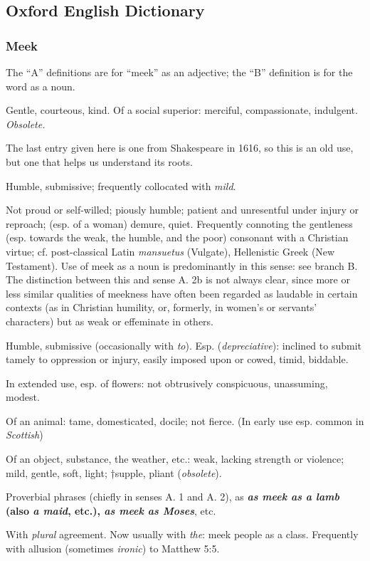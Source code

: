 \subsection{Oxford English Dictionary} %
	\label{MEEKNESS-OED}
	
	\subsubsection{Meek}
	
		The ``A'' definitions are for ``meek'' as an adjective; the ``B'' definition is for the word as a noun.

		\begin{compactitem}
			\item[A.1] Gentle, courteous, kind. Of a social superior: merciful, compassionate, indulgent. \textit{Obsolete.}
				\begin{compactitem}
					\item The last entry given here is one from Shakespeare in 1616, so this is an old use, but one that helps us understand its roots.
				\end{compactitem}
			\item[A.2] Humble, submissive; frequently collocated with \textit{mild}.
			\item[A.2.a] Not proud or self-willed; piously humble; patient and unresentful under injury or reproach; (esp. of a woman) demure, quiet. Frequently connoting the gentleness (esp. towards the weak, the humble, and the poor) consonant with a Christian virtue; cf. post-classical Latin \textit{mansuetus} (Vulgate), Hellenistic Greek  (New Testament). Use of meek as a noun is predominantly in this sense: see branch B. The distinction between this and sense A. 2b is not always clear, since more or less similar qualities of meekness have often been regarded as laudable in certain contexts (as in Christian humility, or, formerly, in women's or servants' characters) but as weak or effeminate in others.
			\item[A.2.b] Humble, submissive (occasionally with \textit{to}). Esp. (\textit{depreciative}): inclined to submit tamely to oppression or injury, easily imposed upon or cowed, timid, biddable.
			\item[A.2.c] In extended use, esp. of flowers: not obtrusively conspicuous, unassuming, modest.
			\item[A.3] Of an animal: tame, domesticated, docile; not fierce. (In early use esp. common in \textit{Scottish})
			\item[A.4] Of an object, substance, the weather, etc.: weak, lacking strength or violence; mild, gentle, soft, light; †supple, pliant (\textit{obsolete}).
			\item[A.5] Proverbial phrases (chiefly in senses A. 1 and A. 2), as \textbf{\textit{as meek as a lamb} (also \textit{a maid}, etc.), \textit{as meek as Moses}}, etc.
			\item[B] With \textit{plural} agreement. Now usually with \textit{the}: meek people as a class. Frequently with allusion (sometimes \textit{ironic}) to Matthew 5:5.
		\end{compactitem}
	
